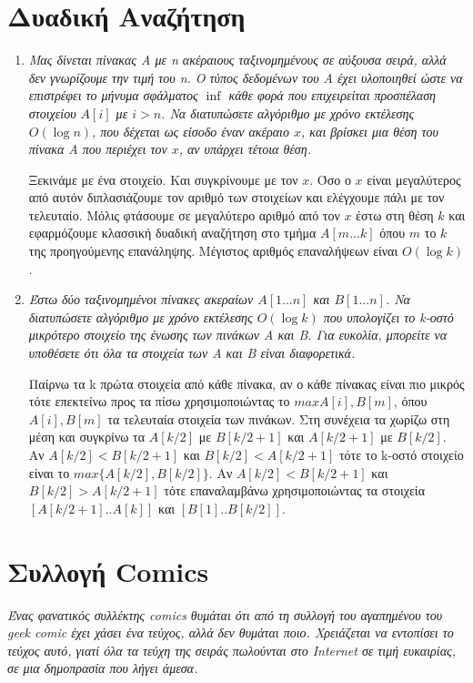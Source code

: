 \documentclass[a4paper,10pt]{article} \usepackage{anysize}
\begin{document}
\section{Δυαδική Αναζήτηση}
\begin{enumerate}
\item \textit{Μας δίνεται πίνακας Α με n ακέραιους ταξινομημένους σε αύξουσα
σειρά, αλλά \emph{δεν γνωρίζουμε την τιμή του n}. Ο τύπος δεδομένων του Α έχει
υλοποιηθεί ώστε να επιστρέφει το μήνυμα σφάλματος $\inf$ κάθε φορά που
επιχειρείται προσπέλαση στοιχείου $A[i]$ με $i > n$. Να διατυπώσετε αλγόριθμο
με χρόνο εκτέλεσης $O(\log{n})$, που δέχεται ως είσοδο έναν ακέραιο $x$, και
βρίσκει μια θέση του πίνακα Α που περιέχει τον $x$, αν υπάρχει τέτοια θέση.}

Ξεκινάμε με ένα στοιχείο. Και συγκρίνουμε με τον $x$. Όσο ο $x$ είναι
μεγαλύτερος από αυτόν διπλασιάζουμε τον αριθμό των στοιχείων και ελέγχουμε
πάλι με τον τελευταίο. Μόλις φτάσουμε σε μεγαλύτερο αριθμό από τον $x$ έστω
στη θέση $k$ και εφαρμόζουμε κλασσική δυαδική αναζήτηση στο τμήμα $A[m...k]$
όπου $m$ το $k$ της προηγούμενης επανάληψης. 
Μέγιστος αριθμός επαναλήψεων είναι $O(\log{k})$.
\item \textit{Έστω δύο ταξινομημένοι πίνακες ακεραίων $A[1...n]$ και
$B[1...n]$. Να διατυπώσετε αλγόριθμο με χρόνο εκτέλεσης $O(\log{k})$ που
υπολογίζει το k-οστό μικρότερο στοιχείο της ένωσης των πινάκων Α και Β. Για
ευκολία, μπορείτε να υποθέσετε ότι όλα τα στοιχεία των Α και Β είναι
διαφορετικά.}

Παίρνω τα k πρώτα στοιχεία από κάθε πίνακα, αν ο κάθε πίνακας είναι πιο μικρός
τότε επεκτείνω προς τα πίσω χρησιμοποιώντας το $max{A[i],B[m]}$, όπου
$A[i],B[m]$ τα τελευταία στοιχεία των πινάκων. Στη συνέχεια τα χωρίζω στη μέση και
συγκρίνω τα $A[k/2]$ με $B[k/2+1]$ και $A[k/2+1]$ με $B[k/2]$. Αν
$A[k/2]<B[k/2+1]$ και $B[k/2]<A[k/2+1]$ τότε το k-οστό στοιχείο είναι το
$max\{A[k/2],B[k/2]\}$. Αν $A[k/2]<B[k/2+1]$ και $B[k/2]>A[k/2+1]$ τότε
επαναλαμβάνω χρησιμοποιώντας τα στοιχεία $[A[k/2+1]..A[k]]$ και
$[B[1]..B[k/2]]$.
\end{enumerate}
\pagebreak
\section{Συλλογή Comics}
\textit{Ένας φανατικός συλλέκτης comics θυμάται ότι από τη συλλογή του
αγαπημένου του geek comic έχει χάσει ένα τεύχος, αλλά δεν θυμάται ποιο.
Χρειάζεται να εντοπίσει το τεύχος αυτό, γιατί όλα τα τεύχη της σειράς
πωλούνται στο Internet σε τιμή ευκαιρίας, σε μια δημοπρασία που λήγει άμεσα.}
\end{document}
